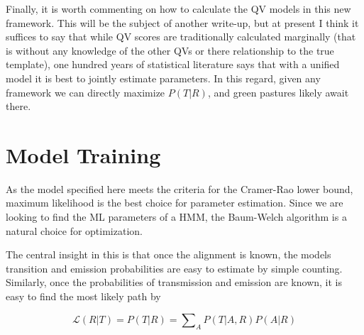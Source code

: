 \documentclass[fleqn,10pt]{SelfArx} %
\begin{document}
Finally, it is worth commenting on how to calculate the QV models in this new framework.  This will be the subject of another write-up, but at present I think it suffices to say that while QV scores are traditionally calculated marginally (that is without any knowledge of the other QVs or there relationship to the true template), one hundred years of statistical literature says that with a unified model it is best to jointly estimate parameters.  In this regard, given any framework we can directly maximize $P(T|R)$, and green pastures likely await there.

\section{Model Training}

As the model specified here meets the criteria for the Cramer-Rao lower bound, maximum likelihood is the best choice for parameter estimation.  Since we are looking to find the ML parameters of a HMM, the Baum-Welch algorithm is a natural choice for optimization.

The central insight in this is that once the alignment is known, the models transition and emission probabilities are easy to estimate by simple counting.  Similarly, once the probabilities of transmission and emission are known, it is easy to find the most likely path by 

\begin{dmath}
\mathcal{L}  (R|T) = P(T|R) = \sum\nolimits_{A} P(T|A,R)P(A|R)
\end{dmath}

\end{document}
